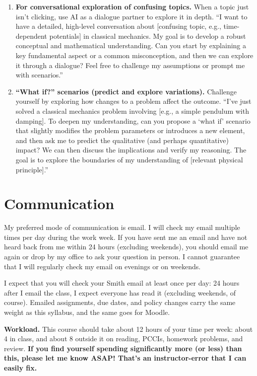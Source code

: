 \begin{enumerate}
\item \textbf{For conversational exploration of confusing topics.} When
  a topic just isn't clicking, use AI as a dialogue partner to explore it
  in depth. ``I want to have a detailed, high-level conversation about
  [confusing topic, e.g., time-dependent potentials] in classical
  mechanics. My goal is to develop a robust conceptual and mathematical
  understanding. Can you start by explaining a key fundamental aspect or
  a common misconception, and then we can explore it through a dialogue?
  Feel free to challenge my assumptions or prompt me with scenarios.''
\item \textbf{``What if?'' scenarios (predict and explore variations).}
  Challenge yourself by exploring how changes to a problem affect the
  outcome. ``I've just solved a classical mechanics problem involving
  [e.g., a simple pendulum with damping]. To deepen my understanding, can
  you propose a `what if' scenario that slightly modifies the problem
  parameters or introduces a new element, and then ask me to predict the
  qualitative (and perhaps quantitative) impact? We can then discuss the
  implications and verify my reasoning. The goal is to explore the
  boundaries of my understanding of [relevant physical principle].''
\end{enumerate}

\bigskip

\section{Communication}
%
My preferred mode of communication is email. I will check my email
multiple times per day during the work week. If you have sent me an
email and have not heard back from me within 24 hours (excluding
weekends), you should email me again or drop by my office to ask your
question in person. I cannot guarantee that I will regularly check my
email on evenings or on weekends.

\medskip I expect that you will check your Smith email at least once per day: 24
hours after I email the class, I expect everyone has read it (excluding
weekends, of course). Emailed assignments, due dates, and policy changes carry
the same weight as this syllabus, and the same goes for Moodle.

\medskip
\textbf{Workload.} This course should take about 12 hours of your time
per week: about 4 in class, and about 8 outside it on reading, PCCIs,
homework problems, and review. \textbf{If you find yourself spending
significantly more (or less) than this, please let me know ASAP! That's
an instructor-error that I can easily fix.}

